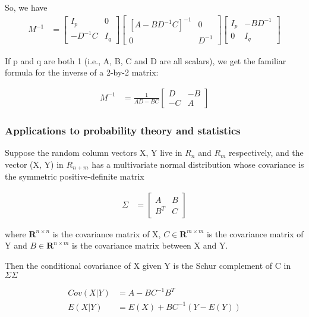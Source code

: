 \documentclass[11pt]{article} %
\begin{document}
So, we have
\begin{align*}
	M^{-1} &=   \begin{bmatrix}
		I_{p} & 0 \\
		-D^{-1}C & I_{q}
	\end{bmatrix}   \begin{bmatrix}
		[A - BD^{-1}C]^{-1} & 0 \\
		0 & D^{-1}
	\end{bmatrix}  \begin{bmatrix}
	I_{p} & -BD^{-1} \\
	0 & I_{q}
\end{bmatrix}  
\end{align*}

If p and q are both 1 (i.e., A, B, C and D are all scalars), we get the familiar formula for the inverse of a 2-by-2 matrix:

\begin{align*}
	M^{-1} &= \frac{1}{AD-BC}  \begin{bmatrix}
		D & -B \\
		-C & A
	\end{bmatrix} 
\end{align*}

\subsubsection{Applications to probability theory and statistics}
Suppose the random column vectors X, Y live in $R_n$ and $R_m$ respectively, and the vector (X, Y) in $R_{n + m}$ has a multivariate normal distribution whose covariance is the symmetric positive-definite matrix

\begin{align*}
	\Sigma &= \begin{bmatrix}
		A & B \\
		B^T & C
	\end{bmatrix} 
\end{align*}

where $\mathbf{R} ^{n\times n}$ is the covariance matrix of X, ${ C\in \mathbf {R} ^{m\times m}}$ is the covariance matrix of Y and ${ B\in \mathbf {R} ^{n\times m}}$ is the covariance matrix between X and Y.

Then the conditional covariance of X given Y is the Schur complement of C in ${\textstyle \Sigma }{\textstyle \Sigma }$

\begin{align*}
	Cov(X|Y) &= A - B C^{-1}B^T \\
	E(X|Y) &= E(X) + B C^{-1} (Y- E(Y))
\end{align*}
\end{document}
